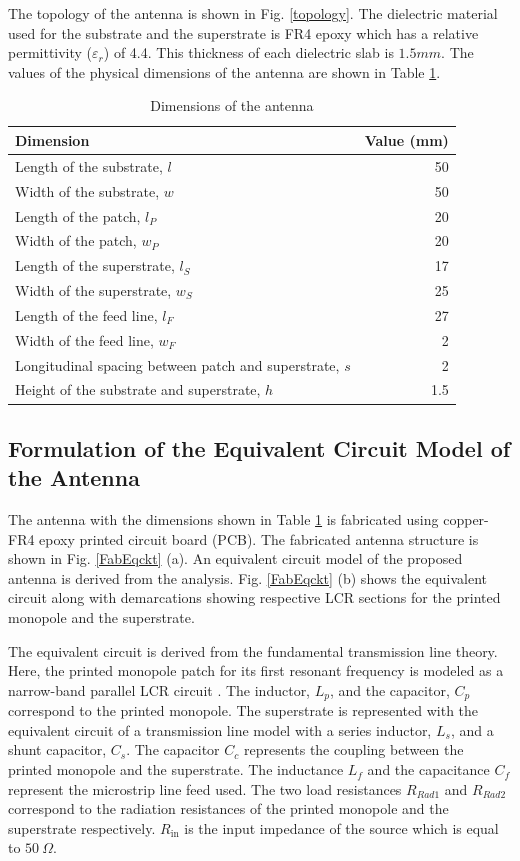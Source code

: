 The topology of the antenna is shown in Fig. \ref{topology}. The dielectric material used for the substrate and the superstrate is FR4 epoxy which has a relative permittivity ($\varepsilon_r$) of 4.4. This thickness of each dielectric slab is $1.5mm$. The values of the physical dimensions of the antenna are shown in Table \ref{table-dims}.
\begin{table}
\centering
\caption{Dimensions of the antenna} \label{table-dims}
\begin{tabular}{|l|r|}
\hline
\textbf{Dimension} & \textbf{Value (mm)} \\ \hline
Length of the substrate, $l$ & 50 \\ \hline
Width of the substrate, $w$ & 50 \\ \hline
Length of the patch, $l_P$ & 20 \\ \hline
Width of the patch, $w_P$ & 20 \\ \hline
Length of the superstrate, $l_S$ & 17 \\ \hline
Width of the superstrate, $w_S$ & 25 \\ \hline
Length of the feed line, $l_F$ & 27 \\ \hline
Width of the feed line, $w_F$ & 2 \\ \hline
Longitudinal spacing between patch and superstrate, $s$ & 2 \\ \hline
Height of the substrate and superstrate, $h$ & 1.5 \\ \hline
\end{tabular}
\end{table}

\subsection{Formulation of the Equivalent Circuit Model of the Antenna}
The antenna with the dimensions shown in Table \ref{table-dims} is fabricated using copper-FR4 epoxy printed circuit board (PCB). The fabricated antenna structure is shown in Fig. \ref{FabEqckt} (a). An equivalent circuit model of the proposed antenna is derived from the analysis. Fig. \ref{FabEqckt} (b) shows the equivalent circuit along with demarcations showing respective LCR sections for the printed monopole and the superstrate.

The equivalent circuit is derived from the fundamental transmission line theory. Here, the printed monopole patch for its first resonant frequency is modeled as a narrow-band parallel LCR circuit \cite{UwbPmaEqCkt1}. The inductor, $L_p$, and the capacitor, $C_p$ correspond to the printed monopole. The superstrate is represented with the equivalent circuit of a transmission line model with a series inductor, $L_s$, and a shunt capacitor, $C_s$. The capacitor $C_c$ represents the coupling between the printed monopole and the superstrate. The inductance $L_{f}$ and the capacitance $C_{f}$ represent the microstrip line feed used. The two load resistances $R_{Rad1}$ and $R_{Rad2}$ correspond to the radiation resistances of the printed monopole and the superstrate respectively. $R_{\text{in}}$ is the input impedance of the source which is equal to $50~\Omega$.


